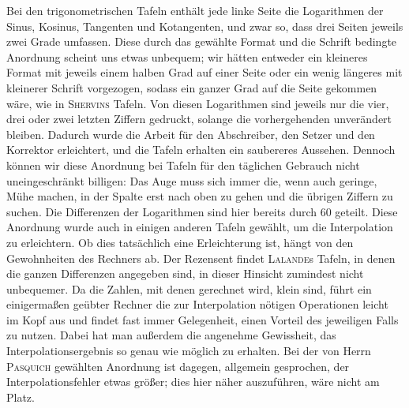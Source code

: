 Bei den trigonometrischen Tafeln enthält jede linke Seite die Logarithmen der Sinus, Kosinus, Tangenten und Kotangenten, und zwar so, dass drei Seiten jeweils zwei Grade umfassen. Diese durch das gewählte Format und die Schrift bedingte Anordnung scheint uns etwas unbequem; 
wir hätten entweder ein kleineres Format mit jeweils einem halben Grad auf einer Seite oder ein wenig längeres mit kleinerer Schrift vorgezogen, sodass ein ganzer Grad auf die Seite gekommen wäre, wie in \textsc{Shervins} Tafeln. Von diesen Logarithmen sind jeweils nur die vier, drei oder zwei letzten Ziffern gedruckt, solange die vorhergehenden unverändert bleiben. Dadurch wurde die Arbeit für den Abschreiber, den Setzer und den Korrektor erleichtert, und die Tafeln erhalten ein saubereres Aussehen. Dennoch können wir diese Anordnung bei Tafeln für den täglichen Gebrauch nicht uneingeschränkt billigen: Das Auge muss sich immer die, wenn auch geringe, Mühe machen, in der Spalte erst nach oben zu gehen und die übrigen Ziffern zu suchen. Die Differenzen der Logarithmen sind hier bereits durch 60 geteilt. Diese Anordnung wurde auch in einigen anderen Tafeln gewählt, um die Interpolation zu erleichtern. Ob dies tatsächlich eine Erleichterung ist, hängt von den Gewohnheiten des Rechners ab. Der Rezensent findet \textsc{Lalande}s Tafeln, in denen die ganzen Differenzen angegeben sind, in dieser Hinsicht zumindest nicht unbequemer. Da die Zahlen, mit denen gerechnet wird, klein sind, führt ein einigermaßen geübter Rechner die zur Interpolation nötigen Operationen leicht im Kopf aus und findet fast immer Gelegenheit, einen Vorteil des jeweiligen Falls zu nutzen. Dabei hat man außerdem die angenehme Gewissheit, das Interpolationsergebnis so genau wie möglich zu erhalten. Bei der von Herrn \textsc{Pasquich} gewählten Anordnung ist dagegen, allgemein gesprochen, der Interpolationsfehler etwas größer; dies hier näher auszuführen, wäre nicht am Platz.

